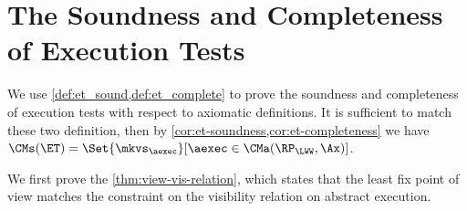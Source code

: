 \section{The Soundness and Completeness of Execution Tests}
\label{app:et_sound_complete}
\label{app:et-sound-complete}
\label{sec:kv-sound-complete-proof}
We use \cref{def:et_sound,def:et_complete} to prove the soundness and completeness of execution tests with respect to axiomatic definitions.
It is sufficient to match these two definition, 
then by \cref{cor:et-soundness,cor:et-completeness} we have \( \CMs(\ET) = \Set{\mkvs_\aexec}[\aexec \in \CMa(\RP_{\LWW},\Ax)] \).
\label{sec:spec-proof}

We first prove the \cref{thm:view-vis-relation}, which states that the least fix point of view matches 
 the constraint on the visibility relation on abstract execution.

